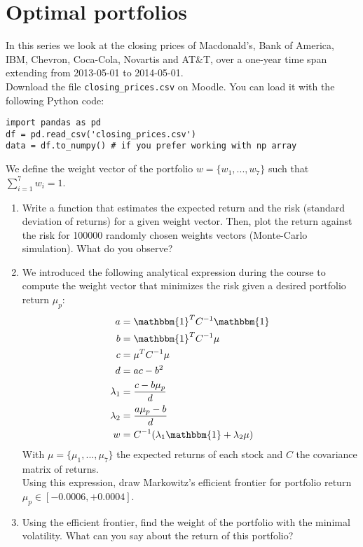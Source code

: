 \section*{Optimal portfolios}

In this series we look at the closing prices of Macdonald's, Bank of America, IBM, Chevron, Coca-Cola, Novartis and AT\&T, over a one-year time span extending from 2013-05-01 to 2014-05-01. \\

\noindent Download the file \texttt{closing\_prices.csv} on Moodle. You can load it with the following Python code:

\begin{verbatim}
import pandas as pd
df = pd.read_csv('closing_prices.csv')
data = df.to_numpy() # if you prefer working with np array
\end{verbatim}

\noindent We define the weight vector of the portfolio $w = \{w_1, ..., w_7\}$ such that $\sum\limits_{i=1}^{7} w_i = 1$.

\begin{enumerate}
    \item Write a function that estimates the expected return and the risk (standard deviation of returns) for a given weight vector. Then, plot the return against the risk for 100000 randomly chosen weights vectors (Monte-Carlo simulation). What do you observe?
    \item We introduced the following analytical expression during the course to compute the weight vector that minimizes the risk given a desired portfolio return $\mu_p$:
        \begin{equation}
        \begin{aligned}
            a &= \mathbbm{1}^T C^{-1} \mathbbm{1} \\
            b &= \mathbbm{1}^T C^{-1} \mu  \\
            c &= \mu^T C^{-1} \mu  \\
            d &= ac - b^2 \\
            \lambda_1 &= \frac{c - b \mu_p}{d} \\
            \lambda_2 &= \frac{a \mu_p - b}{d} \\
            w &= C^{-1} (\lambda_1 \mathbbm{1} + \lambda_2 \mu)  \\
        \end{aligned}
        \end{equation}
    With $\mu = \{\mu_1, ..., \mu_7\}$ the expected returns of each stock and $C$ the covariance matrix of returns.\\ 
    
        \noindent Using this expression, draw Markowitz's efficient frontier for portfolio return $\mu_p \in [-0.0006, +0.0004]$.


    \item Using the efficient frontier, find the weight of the portfolio with the minimal volatility. What can you say about the return of this portfolio?
\end{enumerate}



